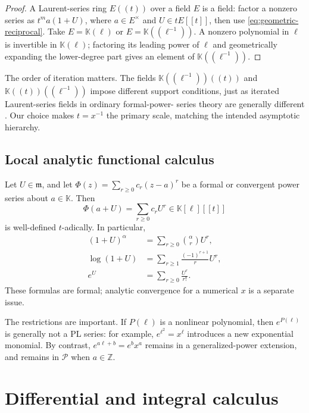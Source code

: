 \documentclass[11pt,oneside]{article}
\numberwithin{equation}{section}
\theoremstyle{definition}
\newcommand{\K}{\mathbb K}
\newcommand{\Z}{\mathbb Z}
\newcommand{\PL}{\mathscr P}
\begin{document}
\begin{proof}
A Laurent-series ring \(E((t))\) over a field \(E\) is a field: factor a nonzero
series as \(t^m a(1+U)\), where \(a\in E^\times\) and \(U\in tE[[t]]\), then use
\eqref{eq:geometric-reciprocal}.  Take \(E=\K(\ell)\) or
\(E=\K((\ell^{-1}))\).  A nonzero polynomial in \(\ell\) is invertible in
\(\K(\ell)\); factoring its leading power of \(\ell\) and geometrically expanding
the lower-degree part gives an element of \(\K((\ell^{-1}))\).
\end{proof}

The order of iteration matters.  The fields
\(\K((\ell^{-1}))((t))\) and \(\K((t))((\ell^{-1}))\) impose different support
conditions, just as iterated Laurent-series fields in ordinary formal-power-
series theory are generally different \cite{GesselLagrange}.  Our choice makes
\(t=x^{-1}\) the primary scale, matching the intended asymptotic hierarchy.

\subsection{Local analytic functional calculus}

Let \(U\in\mathfrak m\), and let
\(\Phi(z)=\sum_{r\ge0}c_r(z-a)^r\) be a formal or convergent power series about
\(a\in\K\).  Then
\begin{equation}\label{eq:local-functional-calculus}
  \Phi(a+U)=\sum_{r\ge0}c_rU^r\in\K[\ell][[t]]
\end{equation}
is well-defined \(t\)-adically.  In particular,
\begin{align}
 (1+U)^\alpha&=\sum_{r\ge0}\binom{\alpha}{r}U^r,\label{eq:binomial-U}\\
 \log(1+U)&=\sum_{r\ge1}\frac{(-1)^{r+1}}{r}U^r,\label{eq:log-U}\\
 e^U&=\sum_{r\ge0}\frac{U^r}{r!}.\label{eq:exp-U}
\end{align}
These formulas are formal; analytic convergence for a numerical \(x\) is a
separate issue.

The restrictions are important.  If \(P(\ell)\) is a nonlinear polynomial,
then \(e^{P(\ell)}\) is generally not a PL series: for example,
\(e^{\ell^2}=x^{\ell}\) introduces a new exponential monomial.  By contrast,
\(e^{a\ell+b}=e^b x^a\) remains in a generalized-power extension, and remains in
\(\PL\) when \(a\in\Z\).

\section{Differential and integral calculus}\label{sec:differential}
\end{document}
